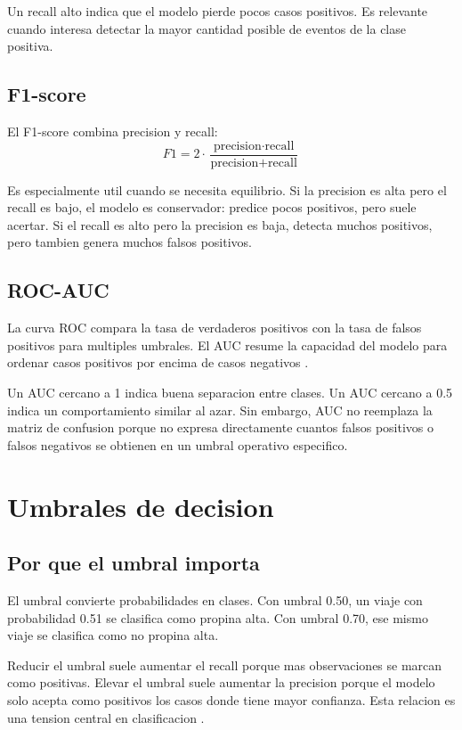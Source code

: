 \documentclass[12pt]{article}
\begin{document}
Un recall alto indica que el modelo pierde pocos casos positivos. Es relevante cuando interesa detectar la mayor cantidad posible de eventos de la clase positiva.

\subsection{F1-score}
El F1-score combina precision y recall:
\[
F1 = 2 \cdot \frac{\text{precision} \cdot \text{recall}}{\text{precision} + \text{recall}}
\]

Es especialmente util cuando se necesita equilibrio. Si la precision es alta pero el recall es bajo, el modelo es conservador: predice pocos positivos, pero suele acertar. Si el recall es alto pero la precision es baja, detecta muchos positivos, pero tambien genera muchos falsos positivos.

\subsection{ROC-AUC}
La curva ROC compara la tasa de verdaderos positivos con la tasa de falsos positivos para multiples umbrales. El AUC resume la capacidad del modelo para ordenar casos positivos por encima de casos negativos \cite{gcp_roc_curve,google_metrics_glossary}.

Un AUC cercano a 1 indica buena separacion entre clases. Un AUC cercano a 0.5 indica un comportamiento similar al azar. Sin embargo, AUC no reemplaza la matriz de confusion porque no expresa directamente cuantos falsos positivos o falsos negativos se obtienen en un umbral operativo especifico.

\section{Umbrales de decision}
\subsection{Por que el umbral importa}
El umbral convierte probabilidades en clases. Con umbral 0.50, un viaje con probabilidad 0.51 se clasifica como propina alta. Con umbral 0.70, ese mismo viaje se clasifica como no propina alta.

Reducir el umbral suele aumentar el recall porque mas observaciones se marcan como positivas. Elevar el umbral suele aumentar la precision porque el modelo solo acepta como positivos los casos donde tiene mayor confianza. Esta relacion es una tension central en clasificacion \cite{google_thresholding}.
\end{document}
